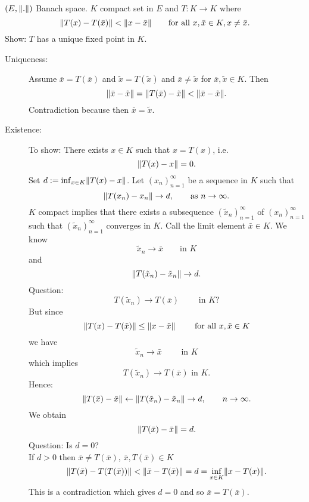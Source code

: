 \begin{beispiel}
	$(E,\norm{.})$ Banach space. $K$ compact set in $E$ and $T : K \to K$ where
	\[
		\norm{T(x)- T( \bar{x})} < \norm{x - \bar{x}} \qquad \text{for all }x, \bar{x} \in K, x \neq \bar{x}.
	\]
	Show: $T$ has a unique fixed point in $K$.
	\begin{description}
		\item[Uniqueness:] Assume $\bar{x} = T(\bar{x})$ and $\tilde x = T( \tilde x)$ and $\bar{x} \neq \tilde x$ for $ \bar{x}, \tilde x \in K$. Then
		\[
			\norm{\bar{x} - \tilde x} = \norm{ T( \bar{ x})- \tilde x} < \norm{ \bar{x}- \tilde x}.
		\]
		Contradiction because then $\bar{x} = \tilde x$.
		\item[Existence:] To show: There exists $x \in K$ such that $x = T(x)$, i.e.
		\[
			\norm{T(x)- x} = 0.
		\]
		Set $d := \inf_{x \in K} \norm{T(x)-x}$. Let $(x_n)_{n=1}^{\infty}$ be a sequence in $K$ such that 
		\[
			\norm{T(x_n)-x_n} \to d, \qquad \text{as }n \to \infty.
		\]
		$K$ compact implies that there exists a subsequence $(\tilde x_n)_{n=1}^{\infty}$ of $(x_n)_{n=1}^{\infty}$ such that $(\tilde x_n)_{n=1}^{\infty}$ converges in $K$. Call the limit element $\bar{x} \in K$. We know
		\[
			\tilde x_n \to  \bar{x} \qquad \text{in }K
		\]
		and	 
		\[
			\norm{T( \tilde x_n)- \tilde x_n} \to d.
		\]
		Question: \[
			T(\tilde x_n) \to T(\bar{x}) \qquad \text{ in }K?
		\]
		But since
		\[
			\norm{T(x)- T( \tilde x)} \leq  \norm{x- \tilde x} \qquad \text{ for all }x, \tilde x \in K
		\]
		we have 
		\[
			\tilde x_n \to \bar{x} \qquad \text{ in }K
		\]
		which implies
		\[
			T( \tilde x_n) \to T( \bar{ x}) \text{ in }K.
		\]
		Hence: 
		\[
			\norm{T( \bar{ x})- \bar{x}} \leftarrow \norm{T(\tilde x_n)- \tilde x_n} \to d, \qquad  n \to  \infty.
		\]
		We obtain
		\[
			\norm{T(\bar{x})- \bar{x}} = d.
		\]
		Question: Is $d=0$? \\
		If $d>0$ then $\bar{x} \neq  T( \bar{x})$, $\bar{x}, T( \bar{x}) \in K$
		\[
			\norm{T(\bar{x})- T(T(\bar{x}))} < \norm{\bar{x}- T(\bar{x})} = d = \inf_{x \in K} \norm{x- T(x)}.
		\]
		This is a contradiction which gives $d=0$ and so $\bar{x} = T(\bar{x})$.
	\end{description}
\end{beispiel}
